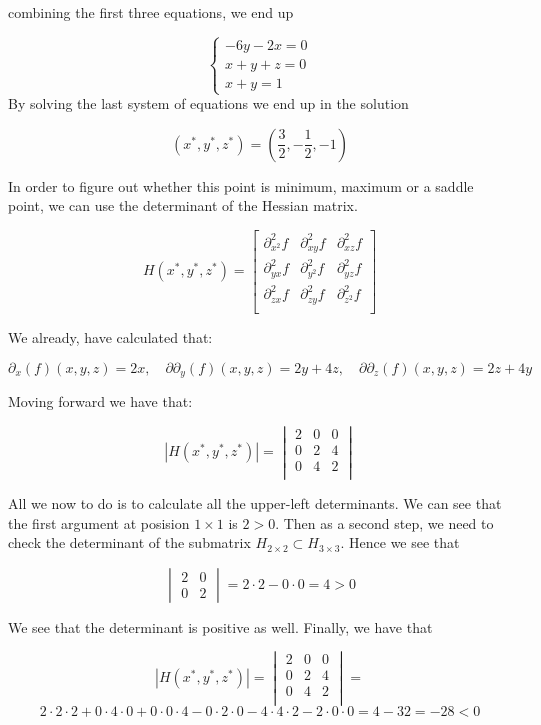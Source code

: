 \documentclass[
]{article}
\begin{document}
combining the first three equations, we end up

\[
\begin{cases}
-6y-2x=0 \\
x+y+z=0 \\
x+y=1
\end{cases}
\] By solving the last system of equations we end up in the solution

\[
(x^*,y^*,z^* )= (\frac{3}{2}, -\frac{1}{2},-1)
\]

In order to figure out whether this point is minimum, maximum or a
saddle point, we can use the determinant of the Hessian matrix.

\[
H(x^*,y^*,z^*) = \begin{bmatrix}
\partial_{x^2}^2f & \partial_{xy}^2f & \partial_{xz}^2f\\
\partial_{yx}^2f & \partial_{y^2}^2f & \partial_{yz}^2f \\
\partial_{zx}^2f & \partial_{zy}^2f & \partial_{z^2}^2f \\
\end{bmatrix}
\]

We already, have calculated that:

\[
\partial_x(f)(x,y,z) = 2x,\quad \partial\partial_y(f)(x,y,z) = 2y+4z,\quad \partial\partial_z(f)(x,y,z) = 2z+4y
\]

Moving forward we have that:

\[
|H(x^*,y^*,z^*)| = \begin{vmatrix}
2 & 0 & 0\\
0 & 2 & 4 \\
0 & 4 & 2 \\
\end{vmatrix}
\]

All we now to do is to calculate all the upper-left determinants. We can
see that the first argument at posision \(1\times1\) is \(2>0\). Then as
a second step, we need to check the determinant of the submatrix
\(H_{2\times2}\subset H_{3\times3}\). Hence we see that

\[
\begin{vmatrix}
2 & 0 \\
0 & 2
\end{vmatrix} = 2\cdot 2 -0\cdot 0 = 4 >0
\]

We see that the determinant is positive as well. Finally, we have that

\[
|H(x^*,y^*,z^*)| = \begin{vmatrix}
2 & 0 & 0\\
0 & 2 & 4 \\
0 & 4 & 2 \\
\end{vmatrix} = 
\] \[
2\cdot2\cdot2+0\cdot4\cdot0+0\cdot0\cdot4-0\cdot2\cdot0-4\cdot4\cdot2-2\cdot0\cdot0=4-32 =-28<0
\]
\end{document}
